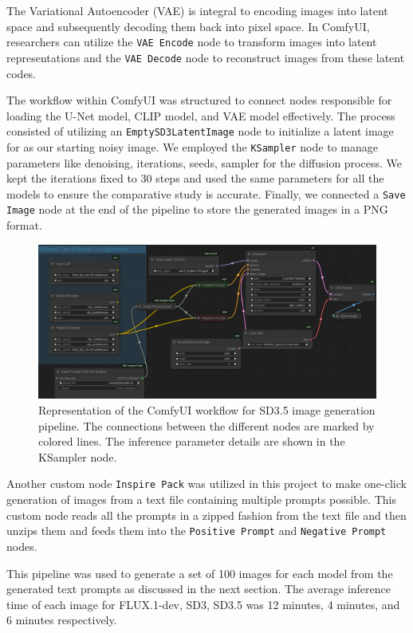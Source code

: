 \documentclass{article}
\begin{document}
The Variational Autoencoder (VAE) \cite{enwiki:1261565566} is integral to encoding images into latent space and subsequently decoding them back into pixel space. In ComfyUI, researchers can utilize the \texttt{VAE Encode} node to transform images into latent representations and the \texttt{VAE Decode} node to reconstruct images from these latent codes.

The workflow within ComfyUI was structured to connect nodes responsible for loading the U-Net model, CLIP model, and VAE model effectively. The process consisted of utilizing an \texttt{EmptySD3LatentImage} node to initialize a latent image for as our starting noisy image. We employed the \texttt{KSampler} node to manage parameters like denoising, iterations, seeds, sampler for the diffusion process. We kept the iterations fixed to 30 steps and used the same parameters for all the models to ensure the comparative study is accurate.
Finally, we connected a \texttt{Save Image} node at the end of the pipeline to store the generated images in a PNG format.

\begin{figure}
	\centering
	\includegraphics[width=1\linewidth]{ComfyUI-workflow}
	\caption{Representation of the ComfyUI workflow for SD3.5 image generation pipeline. The connections between the different nodes are marked by colored lines. The inference parameter details are shown in the KSampler node.}
	\label{fig:comfyui-workflow}
\end{figure}

Another custom node \texttt{Inspire Pack} \cite{inspirepack} was utilized in this project to make one-click generation of images from a text file containing multiple prompts possible. This custom node reads all the prompts in a zipped fashion from the text file and then unzips them and feeds them into the \texttt{Positive Prompt} and \texttt{Negative Prompt} nodes. 

This pipeline was used to generate a set of 100 images for each model from the generated text prompts as discussed in the next section. The average inference time of each image for FLUX.1-dev, SD3, SD3.5 was 12 minutes, 4 minutes, and 6 minutes respectively.
\end{document}
